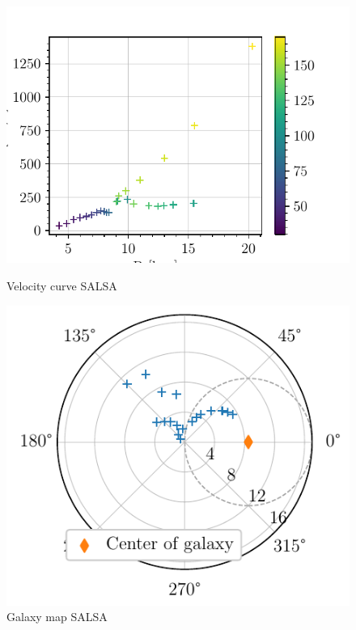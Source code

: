 \begin{figure}[htbp]
    \begin{minipage}[t]{0.5\textwidth}
        \centering
        \captionsetup{width=.9\textwidth}
        \includegraphics[scale=1]{figures/SALSA_velocity_curve.pdf}
        \caption{Velocity curve SALSA}
        \label{fig:SALSA_velocity_curve}
    \end{minipage}
    \begin{minipage}[t]{0.5\textwidth}
        \centering
        \captionsetup{width=.9\textwidth}
        \includegraphics[scale=1]{figures/SALSA_galaxy_map.pdf}
        \caption{Galaxy map SALSA}
        \label{fig:SALSA_galaxy_map}
    \end{minipage}
\end{figure}